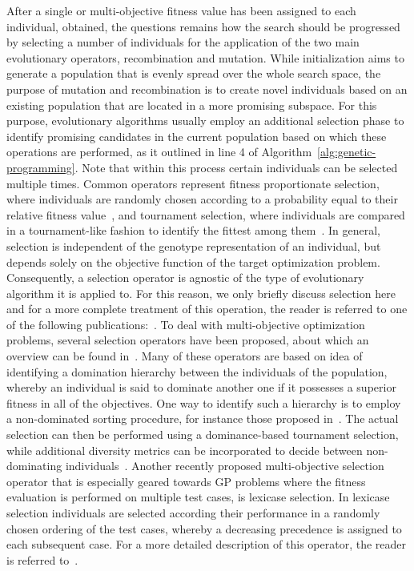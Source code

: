 After a single or multi-objective fitness value has been assigned to each individual, obtained, the questions remains how the search should be progressed by selecting a number of individuals for the application of the two main evolutionary operators, recombination and mutation.
While initialization aims to generate a population that is evenly spread over the whole search space, the purpose of mutation and recombination is to create novel individuals based on an existing population that are located in a more promising subspace.  
For this purpose, evolutionary algorithms usually employ an additional selection phase to identify promising candidates in the current population based on which these operations are performed, as it outlined in line 4 of Algorithm~\ref{alg:genetic-programming}.
Note that within this process certain individuals can be selected multiple times.
Common operators represent fitness proportionate selection, where individuals are randomly chosen according to a probability equal to their relative fitness value~\cite{lipowski2012roulette}, and tournament selection, where individuals are compared in a tournament-like fashion to identify the fittest among them~\cite{fang2010review}.
In general, selection is independent of the genotype representation of an individual, but depends solely on the objective function of the target optimization problem. 
Consequently, a selection operator is agnostic of the type of evolutionary algorithm it is applied to. 
For this reason, we only briefly discuss selection here and for a more complete treatment of this operation, the reader is referred to one of the following publications:~\cite{back1997handbook,beyer2002evolution,goldberg1991comparative}.
To deal with multi-objective optimization problems, several selection operators have been proposed, about which an overview can be found in~\cite{coello2007evolutionary,deb2011multi,deb2015multi}.
Many of these operators are based on idea of identifying a domination hierarchy between the individuals of the population, whereby an individual is said to dominate another one if it possesses a superior fitness in all of the objectives.
One way to identify such a hierarchy is to employ a non-dominated sorting procedure, for instance those proposed in~\cite{deb2002fast,deb2013evolutionary}.
The actual selection can then be performed using a dominance-based tournament selection, while additional diversity metrics can be incorporated to decide between non-dominating individuals~\cite{coello2007evolutionary}.
Another recently proposed multi-objective selection operator that is especially geared towards GP problems where the fitness evaluation is performed on multiple test cases, is lexicase selection.
In lexicase selection individuals are selected according their performance in a randomly chosen ordering of the test cases, whereby a decreasing precedence is assigned to each subsequent case. 
For a more detailed description of this operator, the reader is referred to~\cite{helmuth2014solving,la2016epsilon}.
 
